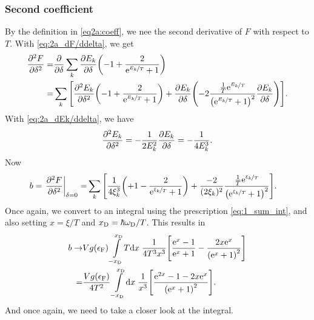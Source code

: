 \documentclass[11pt,letter, swedish, english
]{article}
\newcommand{\eF}{\ensuremath{\epsilon_{\text{F}}}}
\newcommand{\wD}{\ensuremath{\omega_{\text{D}}}}
\begin{document}
\subsubsection{Second coefficient}
By the definition in \eqref{eq2a:coeff}, we nee the second derivative
of $F$ with respect to $T$. With \eqref{eq:2a_dF/ddelta}, we get
\begin{equation}
\begin{aligned}
\pdv[2]{F}{\delta}=&\pdv{\delta}\sum_k\pdv{E_k}{\delta}
\qty(-1 + \frac{2}{\mathrm{e}^{\nicefrac{E_k}{T}}+1})\\
=&\sum_k\qty[\pdv[2]{E_k}{\delta}
\qty(-1 + \frac{2}{\mathrm{e}^{\nicefrac{E_k}{T}}+1})
+\pdv{E_k}{\delta}\qty(
-2\frac{\frac{1}{T}\mathrm{e}^{\nicefrac{E_k}{T}}}{\qty(\mathrm{e}^{\nicefrac{E_k}{T}}+1)^2}
\pdv{E_k}{\delta})
].
\end{aligned}
\end{equation}
With \eqref{eq:2a_dEk/ddelta}, we have
\begin{equation}
\pdv[2]{E_k}{\delta}=-\frac{1}{2E_k^2}\pdv{E_k}{\delta}=-\frac{1}{4E_k^3}.
\end{equation}
Now
\begin{equation}
\begin{aligned}
b=\eval{\pdv[2]{F}{\delta}}_{\delta=0}
=&\sum_k\qty[
\frac{1}{4\xi_k^3}
\qty(+1 - \frac{2}{\ee^{\nicefrac{\xi_k}{T}}+1})
+\frac{-2}{(2\xi_k)^2}
\frac{\frac{1}{T}\ee^{\nicefrac{\xi_k}{T}}}{\qty(\ee^{\nicefrac{\xi_k}{T}}+1)^2}
].
\end{aligned}
\end{equation}
Once again, we convert to an integral using the prescription
\eqref{eq:1_sum_int}, and also setting $x=\xi/T$ and
$\xD=\hbar\wD/T$. This results in 
\begin{equation}
\begin{aligned}
b\to& Vg(\eF)\int_{-\xD}^{\xD}\!T\rd{x}\;
 \frac{1}{4T^3x^3}\qty[
\frac{\ee^{x}-1}{\ee^{x}+1}
-\frac{2x\ee^{x}}{\qty(\ee^{x}+1)^2}
]\\
=&\frac{Vg(\eF)}{4T^2}\int_{-\xD}^{\xD}\!\rd{x}\;
\frac{1}{x^3}
\qty[
\frac{\ee^{2x}-1-2x\ee^{x}}{\qty(\ee^{x}+1)^2}
].\\
\end{aligned}
\end{equation}
And once again, we need to take a closer look at the integral.
\end{document}
